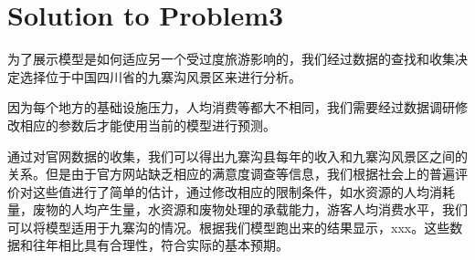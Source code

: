 \documentclass[12pt]{article}  %
\begin{document}
\section{Solution to Problem3}
为了展示模型是如何适应另一个受过度旅游影响的，我们经过数据的查找和收集决定选择位于中国四川省的九寨沟风景区来进行分析。

因为每个地方的基础设施压力，人均消费等都大不相同，我们需要经过数据调研修改相应的参数后才能使用当前的模型进行预测。

通过对官网数据的收集\cite{8}，我们可以得出九寨沟县每年的收入和九寨沟风景区之间的关系。但是由于官方网站缺乏相应的满意度调查等信息，我们根据社会上的普遍评价对这些值进行了简单的估计，通过修改相应的限制条件，如水资源的人均消耗量，废物的人均产生量，水资源和废物处理的承载能力，游客人均消费水平，我们可以将模型适用于九寨沟的情况。根据我们模型跑出来的结果显示，xxx。这些数据和往年相比具有合理性，符合实际的基本预期。
\end{document}
